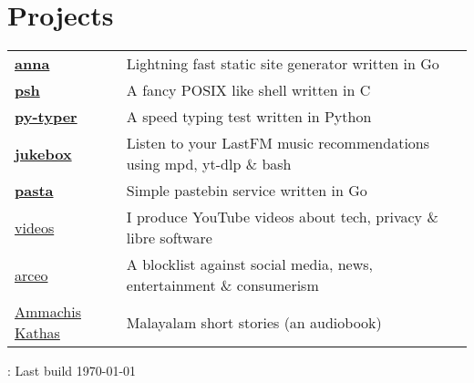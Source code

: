 \documentclass[letter,12pt]{article}
\begin{document}
\section{Projects}
\begin{tabularx}{\linewidth}{@{}l X@{}}
    \textbf{\href{https://github.com/anna-ssg/anna}{anna}} & Lightning fast static site generator written in Go \\
    \textbf{\href{https://github.com/psh-shell/psh}{psh}} & A fancy POSIX like shell written in C \\
    \textbf{\href{https://github.com/polarhive/py-typer}{py-typer}} & A speed typing test written in Python \\
    \textbf{\href{https://github.com/polarhive/jukebox}{jukebox}} & Listen to your LastFM music recommendations using mpd, yt-dlp \& bash \\
    \textbf{\href{https://polarhive.net/pasta}{pasta}} & Simple pastebin service written in Go \\
    \href{https://polarhive.net/videos}{videos} & I produce YouTube videos about tech, privacy \& libre software \\
    \href{https://polarhive.net/arceo}{arceo} & A blocklist against social media, news, entertainment \& consumerism \\
    \href{https://polarhive.net/ammachiskathas}{Ammachis Kathas} & Malayalam short stories (an audiobook) \\
\end{tabularx}

\vfill
\href{https://github.com/polarhive/resume}{}: Last build \today
\end{document}

